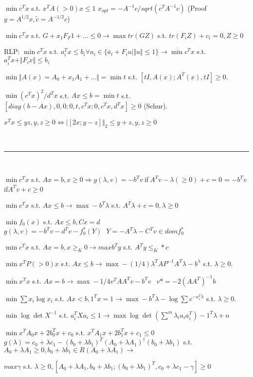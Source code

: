 \documentclass[10pt,twocolumn]{report}
\begin{document}
$\min c^Tx$ s.t. $x^TA(>0)x \le 1$ $x_{opt} = -A^{-1}c/sqrt(c^TA^{-1}c)$  (Proof $y=A^{1/2}x, \tilde{c} = A^{-1/2}c$)

$\min c^Tx$ s.t. $G + x_1F_F1 +... \le 0 \rightarrow \max tr(GZ)$ s.t. $tr(F_iZ)+c_i = 0, Z \ge 0$

RLP: $\min c^Tx$ s.t. $a_i^Tx \le b_i \forall a_i \in \{\bar{a}_i + F_iu | \Vert u \Vert \le 1\} \rightarrow \min c^Tx$ s.t. $a_i^Tx + \Vert F_ix \Vert \le b_i$

$\min \Vert A(x)= A_0 + x_1A_1+... \Vert = \min t$ s.t. $[tI, A(x); A^T(x), tI] \ge 0$.

$\min (c^Tx)^2/d^Tx$ s.t. $Ax \le b = \min t$ s.t. $[diag(b-Ax),0,0;0,t,c^Tx;0,c^Tx,d^Tx] \ge 0$ (Schur). 

$x^Tx \le yz, y,z \ge 0 \iff \vert [2x; y-z] \Vert_2 \le y + z, y,z \ge 0$

~

\hrule

~

$\min c^Tx$ s.t. $Ax=b, x\ge 0 \Rightarrow g(\lambda, v) = -b^Tv ~$if$~ A^Tv - \lambda(\ge0) + c = 0$ = $-b^Tv ~$if$ A^Tv + c \ge 0$

$\min c^Tx$ s.t. $Ax \le b \rightarrow \max -b^T\lambda$ s.t. $A^T\lambda + c = 0,\lambda \ge 0$

$\min f_0(x)$ s.t. $Ax \le b, Cx=d$ $g(\lambda, v) = -b^Tv - d^Tv - f_0^*(Y)~~~Y = -A^T\lambda-C^Tv \in dom f_0^*$ 

$\min c^Tx$ s.t. $Ax=b,x \ge_K 0 \rightarrow max b^Ty$ s.t. $A^Ty \le_K* c$

$\min x^TP(>0)x$ s.t. $Ax \le b \rightarrow \max -(1/4)\lambda^TAP^{-1}A^T\lambda - b^\lambda$ s.t. $\lambda \ge 0$.

$\min x^Tx$ s.t. $Ax = b \rightarrow \max -1/4v^TAA^Tv-b^Tv$ $~~v*= -2(AA^T)^{-1}b$

$\min \sum x_i \log x_i$ s.t. $Ax<b, 1^Tx = 1 \rightarrow \max -b^T\lambda - \log \sum e^{-a_i^T\lambda}$ s.t. $\lambda \ge 0$.

$\min \log \det X^{-1}$ s.t. $a_i^TXa_i \le 1 \rightarrow \max \log \det(\sum^m \lambda_ia_ia_i^T) -1^T\lambda + n$ 

$\min x^TA_0x + 2b_0^Tx + c_0$ s.t. $x^TA_1x + 2b_1^Tx + c_1 \le 0$ $g(\lambda) = c_0 + \lambda c_1 -(b_0 + \lambda b_1)^T(A_0 + \lambda A_1)^{\dagger}(b_0 + \lambda b_1)$ s.t. $A_0 + \lambda A_1 \ge 0, b_0 + \lambda b_1 \in R(A_0+\lambda A_1) \rightarrow $

$max \gamma$ s.t. $\lambda \ge 0, [A_0 + \lambda A_1, b_0+\lambda b_1; (b_0+\lambda b_1)^T, c_0 + \lambda c_1 - \gamma] \ge 0$
\end{document}
